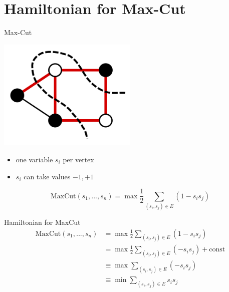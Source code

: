 \section{Hamiltonian for Max-Cut}
\SectionPage{}

\begin{frame}{Max-Cut}
\begin{center}
    \includegraphics[width=0.5\textwidth]{img/lec6/Max-cut.svg.png}
\end{center}
\begin{itemize}
    \item one variable \( s_i \) per vertex
    \item \(s_i\) can take values \( -1, +1 \) 
\end{itemize}
\[ \text{MaxCut}(s_1, ..., s_n) = \max\frac{1}{2} \sum\limits_{(s_i, s_j) \in E} (1 - s_i s_j) \]
\end{frame}

\begin{frame}{Hamiltonian for MaxCut}
\begin{align*}
    \text{MaxCut}(s_1, ..., s_n) 
    & = \max\frac{1}{2} \sum\limits_{(s_i, s_j) \in E} (1 - s_i s_j) \\
    & = \max\frac{1}{2} \sum\limits_{(s_i, s_j) \in E} (- s_i s_j) + \text{const} \\
    & \equiv \max\sum\limits_{(s_i, s_j) \in E} (- s_i s_j) \\
    & \equiv \min\sum\limits_{(s_i, s_j) \in E} s_i s_j
\end{align*}
\end{frame}

